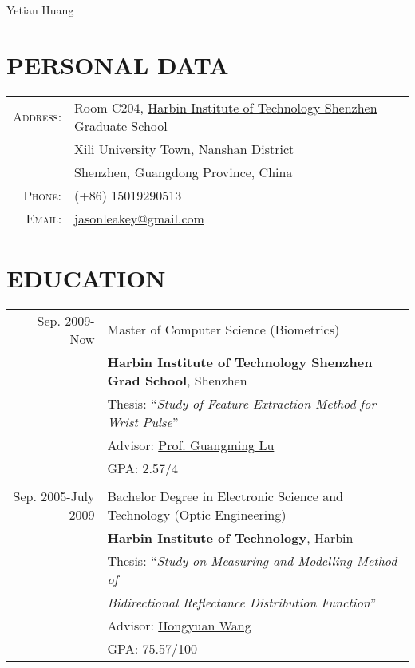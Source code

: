 \documentclass[a4paper,10pt]{article}
\begin{document}
\pagestyle{empty} %


\par{\centering
		{\Huge Yetian Huang}
	\bigskip\par}

\section{PERSONAL DATA}

\begin{tabular}{rl}
    \textsc{Address:}   & Room C204,
    \href{http://www.hitsz.edu.cn}{Harbin Institute of Technology
    Shenzhen Graduate School}\\
    & Xili University Town, Nanshan District \\
    & Shenzhen, Guangdong Province, China \\
    \textsc{Phone:}     & (+86) 15019290513\\
    \textsc{Email:}     & \href{mailto:
    jasonleakey@gmail.com}{jasonleakey@gmail.com}
\end{tabular}

\section{EDUCATION}
\begin{tabular}{rl}	
    \textsf{Sep. 2009-Now} & Master of Computer Science (Biometrics) \\
    & \textbf{Harbin Institute of Technology Shenzhen Grad School}, Shenzhen\\
    & Thesis: ``\textit{Study of Feature Extraction Method for Wrist
    Pulse}'' \\
    & \small Advisor: \href{mailto: luguangm@gmail.com}{Prof.  Guangming Lu}\\
    &\normalsize \textsc{GPA}: 2.57/4 \\&\\
    \textsf{Sep. 2005-July 2009} & Bachelor Degree in Electronic
    Science and Technology (Optic Engineering) \\
    & \textbf{Harbin Institute of Technology}, Harbin \\
    & Thesis: ``\textit{Study on Measuring and Modelling Method of} \\
    & \textit{Bidirectional Reflectance Distribution Function}'' \\
    & \small Advisor: \href{maillto: fountainhy@163.com}{Hongyuan Wang}\\
    &\normalsize \textsc{GPA}: 75.57/100
\end{tabular}
\end{document}
